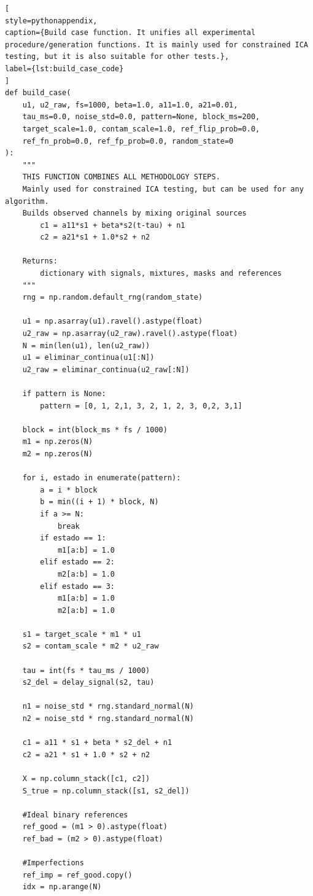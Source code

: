 \begin{lstlisting}[
style=pythonappendix,
caption={Build case function. It unifies all experimental procedure/generation functions. It is mainly used for constrained ICA testing, but it is also suitable for other tests.},
label={lst:build_case_code}
]
def build_case(
    u1, u2_raw, fs=1000, beta=1.0, a11=1.0, a21=0.01,
    tau_ms=0.0, noise_std=0.0, pattern=None, block_ms=200,
    target_scale=1.0, contam_scale=1.0, ref_flip_prob=0.0,
    ref_fn_prob=0.0, ref_fp_prob=0.0, random_state=0
):
    """
    THIS FUNCTION COMBINES ALL METHODOLOGY STEPS.
    Mainly used for constrained ICA testing, but can be used for any algorithm.
    Builds observed channels by mixing original sources
        c1 = a11*s1 + beta*s2(t-tau) + n1
        c2 = a21*s1 + 1.0*s2 + n2

    Returns:
        dictionary with signals, mixtures, masks and references
    """
    rng = np.random.default_rng(random_state)

    u1 = np.asarray(u1).ravel().astype(float)
    u2_raw = np.asarray(u2_raw).ravel().astype(float)
    N = min(len(u1), len(u2_raw))
    u1 = eliminar_continua(u1[:N])
    u2_raw = eliminar_continua(u2_raw[:N])

    if pattern is None:
        pattern = [0, 1, 2,1, 3, 2, 1, 2, 3, 0,2, 3,1]

    block = int(block_ms * fs / 1000)
    m1 = np.zeros(N)
    m2 = np.zeros(N)

    for i, estado in enumerate(pattern):
        a = i * block
        b = min((i + 1) * block, N)
        if a >= N:
            break
        if estado == 1:
            m1[a:b] = 1.0
        elif estado == 2:
            m2[a:b] = 1.0
        elif estado == 3:
            m1[a:b] = 1.0
            m2[a:b] = 1.0

    s1 = target_scale * m1 * u1
    s2 = contam_scale * m2 * u2_raw

    tau = int(fs * tau_ms / 1000)
    s2_del = delay_signal(s2, tau)

    n1 = noise_std * rng.standard_normal(N)
    n2 = noise_std * rng.standard_normal(N)

    c1 = a11 * s1 + beta * s2_del + n1
    c2 = a21 * s1 + 1.0 * s2 + n2

    X = np.column_stack([c1, c2])
    S_true = np.column_stack([s1, s2_del])

    #Ideal binary references
    ref_good = (m1 > 0).astype(float)
    ref_bad = (m2 > 0).astype(float)

    #Imperfections
    ref_imp = ref_good.copy()
    idx = np.arange(N)


\end{lstlisting}
